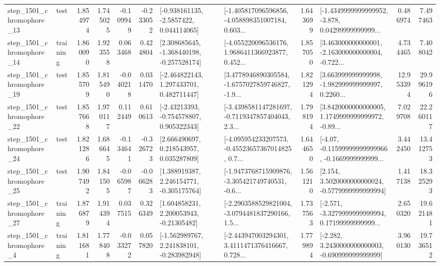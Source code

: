 \begin{tabular}{llrrrrllrlrr}
 step\_1501\_chromophore\_13 &      test &      1.854974 &    1.745025 &     -0.109949 & -0.233052 &     [-0.938161135, -2.5857422, 0.044114065] &  [-1.405817096596856, -4.058898351007184, 0.603... &       1.643699 &  [-1.4349999999999952, -3.878, 0.04299999999999... &            0.486974 &          7.497463 \\
 step\_1501\_chromophore\_14 &  training &      1.860090 &    1.923558 &      0.063468 &  0.424804 &   [2.308685645, -1.368440198, -0.257528174] &  [-4.055220096536176, 1.9686411366923877, 0.452... &       1.857050 &  [3.463000000000001, -2.163000000000004, -0.722... &            4.734465 &          7.408042 \\
 step\_1501\_chromophore\_19 &      test &      1.855709 &    1.815490 &     -0.040218 &  0.031470 &    [-2.464822143, 1.297433701, 0.482711447] &  [3.4778946890305584, -1.6757027859746827, -1.9... &       1.821294 &  [3.663999999999998, -1.982999999999997, 0.2260... &           12.953394 &         29.996196 \\
 step\_1501\_chromophore\_22 &      test &      1.857668 &    1.970117 &      0.112449 &  0.610613 &    [-2.43213393, -0.754578807, 0.905322343] &  [-3.4398581147281697, -0.7119347857404043, 2.3... &       1.798194 &  [3.8420000000000005, 1.1749999999999972, -0.89... &            7.029708 &         22.260117 \\
 step\_1501\_chromophore\_24 &      test &      1.821286 &    1.686645 &     -0.134641 & -0.326723 &     [2.666490697, 0.218543957, 0.035287809] &  [-4.095954233207573, -0.45523657367014825, 0.7... &       1.644650 &  [-4.07, -0.11599999999999966, -0.1669999999999... &            3.442450 &         13.412753 \\
 step\_1501\_chromophore\_25 &      test &      1.907492 &    1.841505 &     -0.065987 & -0.066283 &    [1.388919387, 2.246154771, -0.305175764] &  [-1.9473768715909876, -3.305421749740531, -0.6... &       1.561210 &   [2.154, 3.5020000000000024, -0.5779999999999994] &            1.417138 &         18.325293 \\
 step\_1501\_chromophore\_27 &  training &      1.876879 &    1.914394 &      0.037515 &  0.326349 &     [1.604858231, 2.200053943, -0.21305482] &  [-2.2903588529821004, -3.0794481837290166, 1.5... &       1.737563 &  [-2.571, -3.3279999999999994, 0.17199999999999... &            2.650320 &         19.621481 \\
  step\_1501\_chromophore\_4 &  training &      1.811681 &    1.778408 &     -0.033272 &  0.057820 &   [-1.562989767, 2.241838101, -0.283982948] &  [-2.443947003294301, 3.4111471376416667, 0.728... &       1.779894 &   [-2.282, 3.2430000000000003, -0.690999999999999] &            3.960130 &         19.736512 \\

\end{tabular}
